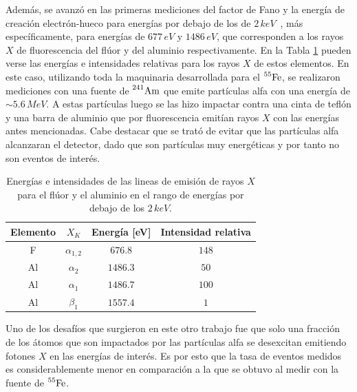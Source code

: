 Además, se avanzó en las primeras mediciones del factor de Fano y la energía de creación electrón-hueco para energías por debajo de los de $2\,\si{keV}$~\cite{TesisKevin}, más específicamente, para energías de $677\,\si{eV}$ y $1486\,\si{eV}$, que corresponden a los rayos $X$ de fluorescencia del flúor y del aluminio respectivamente. En la Tabla \ref{tab:EnergiasFluorescenciaFAl} pueden verse las energías e intensidades relativas para los rayos $X$ de estos elementos. En este caso, utilizando toda la maquinaria desarrollada para el $\prescript{55}{}{\mbox{Fe}}$, se realizaron mediciones con una fuente de $\prescript{241}{}{\mbox{Am}}$ que emite partículas alfa con una energía de $\sim 5.6\,\si{MeV}$. A estas partículas luego se las hizo impactar contra una cinta de teflón y una barra de aluminio que por fluorescencia emitían rayos $X$ con las energías antes mencionadas. Cabe destacar que se trató de evitar que las partículas alfa alcanzaran el detector, dado que son partículas muy energéticas y por tanto no son eventos de interés.
\begin{table}[h]
\centering
\begin{tabular}{@{}cccc@{}}
\toprule
Elemento    &   $X_{K}$         &   Energía [eV]    &   Intensidad relativa \\ \hline \hline
F           &   $\alpha_{1,2}$  &   $676.8$         &   $148$               \\
Al          &   $\alpha_{2}$    &   $1486.3$        &   $50$                \\
Al          &   $\alpha_{1}$    &   $1486.7$        &   $100$               \\
Al          &   $\beta_{1}$     &   $1557.4$        &   $1$                 \\ \bottomrule
\end{tabular}
\caption{\footnotesize{Energías e intensidades de las lineas de emisión de rayos $X$ para el flúor y el aluminio en el rango de energías por debajo de los $2\,\si{keV}$.}}
\label{tab:EnergiasFluorescenciaFAl}
\end{table}

Uno de los desafíos que surgieron en este otro trabajo fue que solo una fracción de los átomos que son impactados por las partículas alfa se desexcitan emitiendo fotones $X$ en las energías de interés. Es por esto que la tasa de eventos medidos es considerablemente menor en comparación a la que se obtuvo al medir con la fuente de $\prescript{55}{}{\mbox{Fe}}$.

